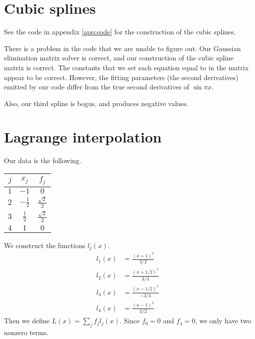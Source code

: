 \documentclass[11pt,letterpaper]{article}
\begin{document}
\section{Cubic splines}

See the code in appendix \ref{app:code} for the construction of the cubic
splines.

There is a problem in the code that we are unable to figure out.
Our Gaussian elimination matrix solver is correct, and our construction of the
cubic spline matrix is correct.
The constants that we set each equation equal to in the matrix appear to be
correct. However, the fitting parameters (the second derivatives) emitted by
our code differ from the true second derivatives of $\sin {\pi x}$.

Also, our third spline is bogus, and produces negative values.

\section{Lagrange interpolation}

Our data is the following.

\begin{center}
  \begin{tabular}{ccc}
    $j$ & $x_j$ & $f_j$ \\ \hline
    $1$ & $-1$ & $0$ \\
    $2$ & $-\frac{1}{2}$ & $\frac{\sqrt{2}}{2}$ \\
    $3$ & $\frac{1}{2}$ & $\frac{\sqrt{2}}{2}$ \\
    $4$ & $1$ & $0$
  \end{tabular}
\end{center}

We construct the functions $l_j(x)$.
%
\begin{align*}
  l_1(x)
  &= \frac{(x + 1)^3}{3/2} \\
  l_2(x)
  &= \frac{(x + 1/2)^3}{3/4} \\
  l_3(x)
  &= \frac{(x - 1/2)^3}{-3/4} \\
  l_4(x)
  &= \frac{(x - 1)^3}{3/2}
\end{align*}
%
Then we define $L(x) = \sum_j f_j l_j(x)$.
Since $f_0 = 0$ and $f_4 = 0$, we only have two nonzero terms.
\end{document}
